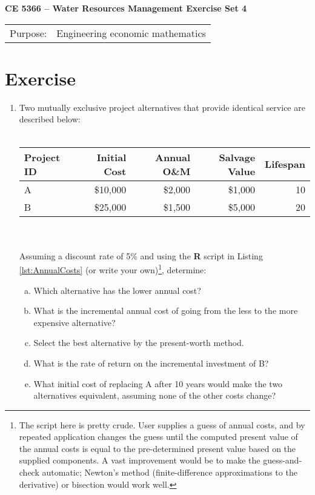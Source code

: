 \documentclass[12pt]{article}
\begin{document}
\begin{center}
{\textbf{{ CE 5366 -- Water Resources Management}  {Exercise Set 4}}}
\end{center}
\begingroup
\begin{tabular}{p{1in} p{5in}}
Purpose: & Engineering economic mathematics \\
\end{tabular}
\endgroup
\section*{\small{Exercise}}
\begin{enumerate}
\item Two mutually exclusive project alternatives that provide identical service are described below: \\~\\
\begin{tabular}{lrrrr}
Project ID & Initial Cost & Annual O\&M & Salvage Value & Lifespan \\
\hline
\hline
A & \$10,000 & \$2,000 & \$1,000 & 10  \\
B & \$25,000 & \$1,500 & \$5,000 & 20  \\
\end{tabular}\\~\\
Assuming a discount rate of 5\% and using the \textbf{R} script in Listing \ref{lst:AnnualCosts} (or write your own)\footnote{The script here is pretty crude.  User supplies a guess of annual costs, and by repeated application changes the guess until the computed present value of the annual costs is equal to the pre-determined present value based on the supplied components.  A vast improvement would be to make the guess-and-check automatic; Newton's method (finite-difference approximations to the derivative) or bisection would work well.}, determine:
\begin{enumerate}[a)]
\item Which alternative has the lower annual cost?
\item What is the incremental annual cost of going from the less to the more expensive alternative?
\item Select the best alternative by the present-worth method.
\item What is the rate of return on the incremental investment of B?
\item What initial cost of replacing A after 10 years would make the two alternatives equivalent, assuming none of the other costs change?

\end{enumerate}
\end{enumerate}
\end{document}
